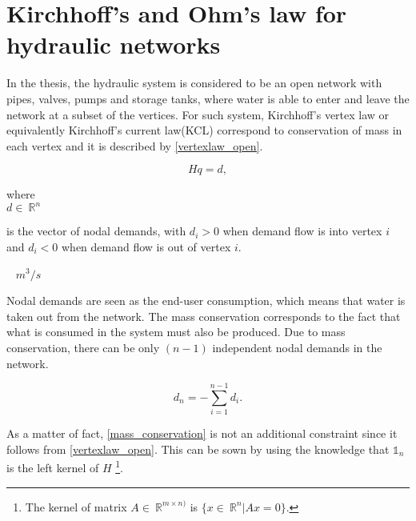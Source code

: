 \section{Kirchhoff's and Ohm's law for hydraulic networks}
\label{kirchhoffs_law}

In the thesis, the hydraulic system is considered to be an open network with pipes, valves, pumps and storage tanks, where water is able to enter and leave the network at a subset of the vertices. For such system, Kirchhoff's vertex law or equivalently Kirchhoff's current law(KCL) correspond to conservation of mass in each vertex and it is described by \eqref{vertexlaw_open}.

\begin{equation}
  \label{vertexlaw_open}
  Hq = d,
\end{equation}

  \begin{minipage}[t]{0.20\textwidth}
where\\
\hspace*{8mm} $d \in \: \mathbb{R}^{n}$ 
\end{minipage}
\begin{minipage}[t]{0.68\textwidth}
\vspace*{2mm}
is the vector of nodal demands, with $d_i > 0$ when demand flow is into vertex $i$ and $d_i < 0$ when demand flow is out of vertex $i$.
\end{minipage}
\begin{minipage}[t]{0.10\textwidth}
\vspace*{2mm}
\textcolor{White}{te}$\unit{m^3/s}$
\end{minipage}

Nodal demands are seen as the end-user consumption, which means that water is taken out from the network. The mass conservation corresponds to the fact that what is consumed in the system must also be produced. Due to mass conservation, there can be only $(n-1)$ independent nodal demands in the network.

\begin{equation}
  \label{mass_conservation}
  d_n = - \sum_{i=1}^{n-1} d_i. 
\end{equation}

As a matter of fact, \eqref{mass_conservation} is not an additional constraint since it follows from \eqref{vertexlaw_open}. This can be sown by using the knowledge that $\mathbb{1}_n$ is the left kernel of $H$ \footnote{The kernel of matrix $A \in \: \mathbb{R}^{m \times n)}$ is $ \{x \in \: \mathbb{R}^{n} | Ax = 0 \} $.}.

